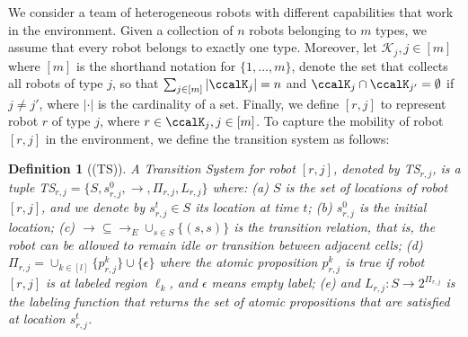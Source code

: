 \documentclass[Afour,sageh,times]{sagej}
\newtheorem{defn}[thm]{Definition}
\begin{document}
 We consider a team of heterogeneous robots with different capabilities that work in the environment. Given a collection of $n$ robots belonging to $m$ types, we assume that every robot belongs to exactly one type. Moreover, let $\mathcal{K}_j, j\in[m]$ where $[m]$ is the shorthand notation for  $\{1,\ldots,m\}$, denote the set that  collects all robots of type $j$, so that $\sum_{j\in [m]} |\ccalK_j| = n$ and $\ccalK_{j} \cap \ccalK_{j'} = \emptyset$ if $j \not= j'$, where $|\cdot|$ is the cardinality of a set. Finally, we define $[r,j]$ to represent robot $r$ of type $j$, where $r\in \ccalK_j, j\in [m]$. To capture the mobility of robot $[r,j]$ in the environment, we define the { transition system} as follows:

\begin{defn}[(TS)]\label{def:ts}
  A { Transition System} for robot $[r,j]$, denoted by TS$_{r,j}$, is a tuple TS$_{r,j} = \{S, s_{r,j}^0, \to, \Pi_{r,j}, L_{r,j}\}$ where: (a) $S$ is the set of locations of robot $[r,j]$, and we denote by $s_{r,j}^t \in S$ its location at time $t$; (b) $s_{r,j}^0$ is the initial location; (c) $\to \subseteq \to_{E} \cup_{s\in S} \{(s,s)\} $ is the transition relation, that is, the robot can be allowed to remain idle or transition between adjacent cells; (d) $\Pi_{r,j} = \cup_{k\in [l]}\{p_{r,j}^k\} \cup \{\epsilon\}$ where the atomic proposition $p_{r,j}^{k}$ is true if robot $[r,j]$ is at labeled region $\ell_k$, and $\epsilon$ means empty label; (e) and $L_{r,j}: S \to 2^{\Pi_{r,j}} $ is the labeling function that returns the set of atomic propositions that are satisfied at location $s_{r,j}^t$.
\end{defn}
\end{document}
